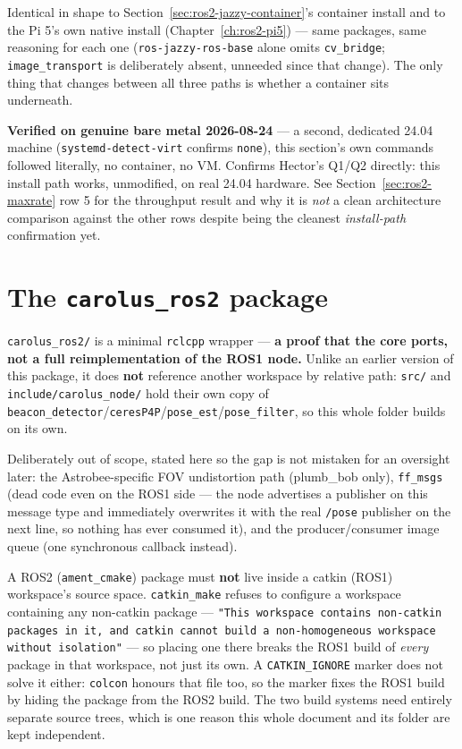 \documentclass[11pt]{report}
\newenvironment{warningbox}%
  {\begin{lrbox}{\warnbox}\begin{minipage}{0.90\textwidth}}%
  {\end{minipage}\end{lrbox}%
   \begin{center}\fcolorbox{black}{codebg}{\usebox{\warnbox}}\end{center}}
\begin{document}
Identical in shape to Section~\ref{sec:ros2-jazzy-container}'s container
install and to the Pi 5's own native install
(Chapter~\ref{ch:ros2-pi5}) --- same packages, same reasoning for each
one (\texttt{ros-jazzy-ros-base} alone omits \texttt{cv\_bridge};
\texttt{image\_transport} is deliberately absent, unneeded since that change).
The only thing that changes between all three paths is whether a container
sits underneath.

\textbf{Verified on genuine bare metal 2026-08-24} --- a second, dedicated
24.04 machine (\texttt{systemd-detect-virt} confirms \texttt{none}), this
section's own commands followed literally, no container, no VM. Confirms
Hector's Q1/Q2 directly: this install path works, unmodified, on real
24.04 hardware. See Section~\ref{sec:ros2-maxrate} row 5 for the throughput
result and why it is \emph{not} a clean architecture comparison against the
other rows despite being the cleanest \emph{install-path} confirmation yet.


\section{The \texttt{carolus\_ros2} package}
\label{sec:ros2-carolus-package}

\texttt{carolus\_ros2/} is a minimal \texttt{rclcpp} wrapper --- \textbf{a
proof that the core ports, not a full reimplementation of the ROS1 node.}
Unlike an earlier version of this package, it does \textbf{not} reference
another workspace by relative path: \texttt{src/} and
\texttt{include/carolus\_node/} hold their own copy of
\texttt{beacon\_detector}/\texttt{ceresP4P}/\texttt{pose\_est}/\texttt{pose\_filter},
so this whole folder builds on its own.

Deliberately out of scope, stated here so the gap is not mistaken for an
oversight later: the Astrobee-specific FOV undistortion path (plumb\_bob
only), \texttt{ff\_msgs} (dead code even on the ROS1 side --- the node
advertises a publisher on this message type and immediately overwrites it
with the real \texttt{/pose} publisher on the next line, so nothing has ever
consumed it), and the producer/consumer image queue (one synchronous
callback instead).

\begin{warningbox}
A ROS2 (\texttt{ament\_cmake}) package must \textbf{not} live inside a
catkin (ROS1) workspace's source space. \texttt{catkin\_make} refuses to
configure a workspace containing any non-catkin package --- \texttt{"This
workspace contains non-catkin packages in it, and catkin cannot build a
non-homogeneous workspace without isolation"} --- so placing one there
breaks the ROS1 build of \emph{every} package in that workspace, not just
its own. A \texttt{CATKIN\_IGNORE} marker does not solve it either:
\texttt{colcon} honours that file too, so the marker fixes the ROS1 build by
hiding the package from the ROS2 build. The two build systems need entirely
separate source trees, which is one reason this whole document and its
folder are kept independent.
\end{warningbox}
\end{document}
